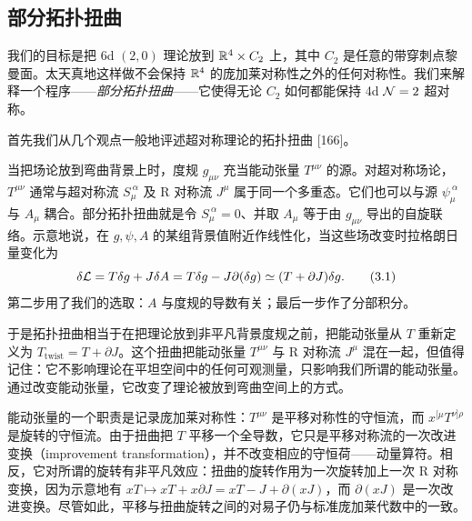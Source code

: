 \subsection{部分拓扑扭曲}

我们的目标是把 6d $(2,0)$ 理论放到 $\mathbb{R}^4\times C_2$ 上，其中 $C_2$ 是任意的带穿刺点黎曼面。太天真地这样做不会保持 $\mathbb{R}^4$ 的庞加莱对称性之外的任何对称性。我们来解释一个程序------\emph{部分拓扑扭曲}------它使得无论 $C_2$ 如何都能保持 4d $\mathcal{N}=2$ 超对称。

首先我们从几个观点一般地评述超对称理论的拓扑扭曲 [166]。

当把场论放到弯曲背景上时，度规 $g_{\mu\nu}$ 充当能动张量 $T^{\mu\nu}$ 的源。对超对称场论，$T^{\mu\nu}$ 通常与超对称流 $S_\mu^{\ \alpha}$ 及 R 对称流 $J^\mu$ 属于同一个多重态。它们也可以与源 $\psi_\mu^{\ \alpha}$ 与 $A_\mu$ 耦合。部分拓扑扭曲就是令 $S_\mu^{\ \alpha}=0$、并取 $A_\mu$ 等于由 $g_{\mu\nu}$ 导出的自旋联络。示意地说，在 $g,\psi,A$ 的某组背景值附近作线性化，当这些场改变时拉格朗日量变化为
\begin{equation}
\delta\mathcal{L} = T\delta g + J\delta A = T\delta g - J\partial(\delta g) \simeq (T+\partial J)\delta g .
\tag{3.1}
\end{equation}
第二步用了我们的选取：$A$ 与度规的导数有关；最后一步作了分部积分。


于是拓扑扭曲相当于在把理论放到非平凡背景度规之前，把能动张量从 $T$ 重新定义为 $T_{\mathrm{twist}}=T+\partial J$。这个扭曲把能动张量 $T^{\mu\nu}$ 与 R 对称流 $J^\mu$ 混在一起，但值得记住：它不影响理论在平坦空间中的任何可观测量，只影响我们所谓的能动张量。通过改变能动张量，它改变了理论被放到弯曲空间上的方式。

能动张量的一个职责是记录庞加莱对称性：$T^{\mu\nu}$ 是平移对称性的守恒流，而 $x^{[\mu}T^{\nu]\rho}$ 是旋转的守恒流。由于扭曲把 $T$ 平移一个全导数，它只是平移对称流的一次改进变换（improvement transformation），并不改变相应的守恒荷------动量算符。相反，它对所谓的旋转有非平凡效应：扭曲的旋转作用为一次旋转加上一次 R 对称变换，因为示意地有 $xT\mapsto xT+x\partial J=xT-J+\partial(xJ)$，而 $\partial(xJ)$ 是一次改进变换。尽管如此，平移与扭曲旋转之间的对易子仍与标准庞加莱代数中的一致。

